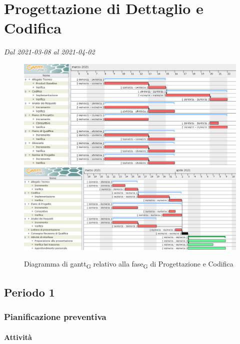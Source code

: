 \section{Progettazione di Dettaglio e Codifica}
\textit{Dal 2021-03-08 al 2021-04-02}

\begin{figure}[H]
	\centering
	\includegraphics[scale=0.52]{res/images/04_gantt_codifica_obbligatori.png}
	\includegraphics[scale=0.48]{res/images/05_gantt_codifica_desiderabili.png}
	\caption{Diagramma di gantt\textsubscript{G} relativo alla fase\textsubscript{G} di Progettazione  e Codifica}
\end{figure}


\subsection{Periodo 1}

\subsubsection{Pianificazione preventiva}

\paragraph{Attività}

\planningTable{
	
}

